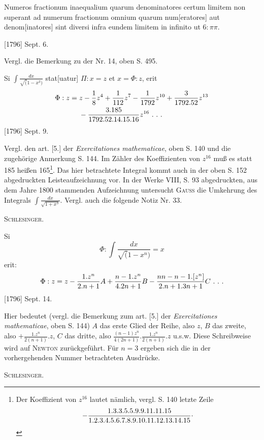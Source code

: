 \clearpage{}
\indent Numeros fractionum inaequalium quarum denominatores certum limitem non superant ad numerum fractionum omnium quarum num[eratores] aut denom[inatores] sint diversi infra eundem limitem in infinito ut \(6:\pi\pi\).
\par\noindent\hfill[1796] Sept. 6.

\medskip\begingroup\small
\indent Vergl. die Bemerkung zu der Nr. 14, oben S. 495.
\par\endgroup

\indent Si \(\displaystyle\int\frac{dx}{\surd(1-x^3)}\) stat[uatur] \(\Pi:x=z\) et \(x=\Phi:z\), erit
\[
\begin{aligned}
\Phi:z={}&z-\frac18z^4+\frac1{112}z^7-\frac1{1792}z^{10}+\frac3{1792.52}z^{13}\\
&-\frac{3.185}{1792.52.14.15.16}z^{16}\ \ldotp\,\ldotp\,\ldotp
\end{aligned}
\]
\noindent\hfill[1796] Sept. 9.

\medskip\begingroup\small
\indent Vergl. den art. [5.] der \textit{Exercitationes mathematicae}, oben S. 140 und die zugehörige Anmerkung S. 144. Im Zähler des Koeffizienten von \(z^{16}\) muß es statt 185 heißen 165\footnote{Der Koeffizient von \(z^{16}\) lautet nämlich, vergl. S. 140 letzte Zeile
\[
-\frac{1.3.3.5.5.9.9.11.11.15}{1.2.3.4.5.6.7.8.9.10.11.12.13.14.15}\mathpunct{\raisebox{.5ex}{\normalfont .}}
\]
}. Das hier betrachtete Integral kommt auch in der oben S. 152 abgedruckten Leisteaufzeichnung vor. In der Werke VIII, S. 93 abgedruckten, aus dem Jahre 1800 stammenden Aufzeichnung untersucht \textsc{Gauss} die Umkehrung des Integrals \(\displaystyle\int\frac{dx}{\sqrt{1+x^3}}\). Vergl. auch die folgende Notiz Nr. 33.
\par\noindent\hfill\textsc{Schlesinger.}
\par\endgroup

\indent Si
\[
\Phi:\int\frac{dx}{\surd(1-x^n)}=x
\]
\noindent erit:
\[
\Phi:z=z-\frac{1.z^n}{2.n+1}A+\frac{n-1.z^n}{4.2n+1}B-\frac{nn-n-1.[z^n]}{2.n+1.3n+1}C\ \ldotp\,\ldotp\,\ldotp
\]
\noindent\hfill[1796] Sept. 14.

\medskip\begingroup\small
\indent Hier bedeutet (vergl. die Bemerkung zum art. [5.] der \textit{Exercitationes mathematicae}, oben S. 144) \(A\) das erste Glied der Reihe, also \(z\), \(B\) das zweite, also \(+\frac{1.z^n}{2(n+1)}.z\), \(C\) das dritte, also \(\frac{(n-1)z^n}{4(2n+1)}.\frac{1.z^n}{2(n+1)}.z\) u.s.w. Diese Schreibweise wird auf \textsc{Newton} zurückgeführt. Für \(n=3\) ergeben sich die in der vorhergehenden Nummer betrachteten Ausdrücke.
\par\noindent\hfill\textsc{Schlesinger.}
\par\endgroup

